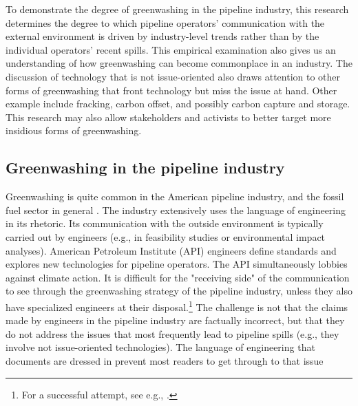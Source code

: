 To demonstrate the degree of greenwashing in the pipeline industry, this research determines the degree to which pipeline operators' communication with the external environment is driven by industry-level trends rather than by the individual operators' recent spills. This empirical examination also gives us an understanding of how greenwashing can become commonplace in an industry. The discussion of technology that is not issue-oriented also draws attention to other forms of greenwashing that front technology but miss the issue at hand. Other example include fracking, carbon offset, and possibly carbon capture and storage. This research may also allow stakeholders and activists to better target more insidious forms of greenwashing.

\subsection{Greenwashing in the pipeline industry}

Greenwashing is quite common in the American pipeline industry, and the fossil fuel sector in general \citep{Kassinis2018}. The industry extensively uses the language of engineering in its rhetoric. Its communication with the outside environment is typically carried out by engineers (e.g., in feasibility studies or environmental impact analyses). American Petroleum Institute (API) engineers define standards and explores new technologies for pipeline operators. The API simultaneously lobbies against climate action. It is difficult for the "receiving side" of the communication to see through the greenwashing strategy of the pipeline industry, unless they also have specialized engineers at their disposal.\footnote{For a successful attempt, see e.g., \citet{Stansbury2011}.} The challenge is not that the claims made by engineers in the pipeline industry are factually incorrect, but that they do not address the issues that most frequently lead to pipeline spills (e.g., they involve not issue-oriented technologies). The language of engineering that documents are dressed in prevent most readers to get through to that issue

